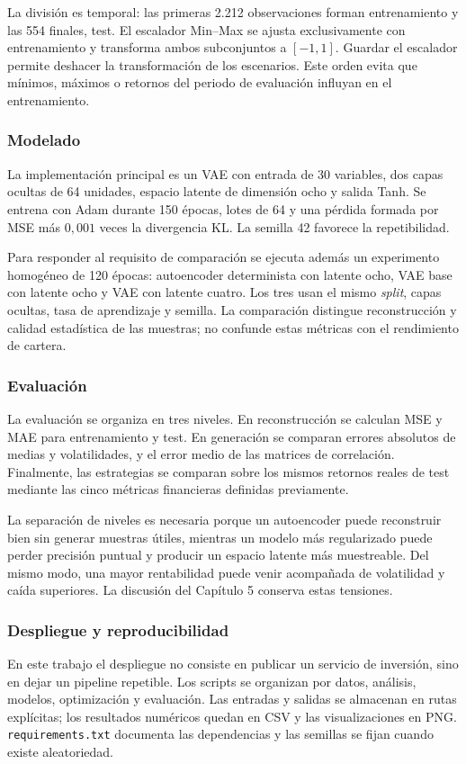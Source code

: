 La división es temporal: las primeras 2.212 observaciones forman entrenamiento y las 554 finales, test. El escalador Min--Max se ajusta exclusivamente con entrenamiento y transforma ambos subconjuntos a $[-1,1]$. Guardar el escalador permite deshacer la transformación de los escenarios. Este orden evita que mínimos, máximos o retornos del periodo de evaluación influyan en el entrenamiento.

\subsubsection{Modelado}
La implementación principal es un VAE con entrada de 30 variables, dos capas ocultas de 64 unidades, espacio latente de dimensión ocho y salida Tanh. Se entrena con Adam durante 150 épocas, lotes de 64 y una pérdida formada por MSE más $0{,}001$ veces la divergencia KL. La semilla 42 favorece la repetibilidad.

Para responder al requisito de comparación se ejecuta además un experimento homogéneo de 120 épocas: autoencoder determinista con latente ocho, VAE base con latente ocho y VAE con latente cuatro. Los tres usan el mismo \textit{split}, capas ocultas, tasa de aprendizaje y semilla. La comparación distingue reconstrucción y calidad estadística de las muestras; no confunde estas métricas con el rendimiento de cartera.

\subsubsection{Evaluación}
La evaluación se organiza en tres niveles. En reconstrucción se calculan MSE y MAE para entrenamiento y test. En generación se comparan errores absolutos de medias y volatilidades, y el error medio de las matrices de correlación. Finalmente, las estrategias se comparan sobre los mismos retornos reales de test mediante las cinco métricas financieras definidas previamente.

La separación de niveles es necesaria porque un autoencoder puede reconstruir bien sin generar muestras útiles, mientras un modelo más regularizado puede perder precisión puntual y producir un espacio latente más muestreable. Del mismo modo, una mayor rentabilidad puede venir acompañada de volatilidad y caída superiores. La discusión del Capítulo 5 conserva estas tensiones.

\subsubsection{Despliegue y reproducibilidad}
En este trabajo el despliegue no consiste en publicar un servicio de inversión, sino en dejar un pipeline repetible. Los scripts se organizan por datos, análisis, modelos, optimización y evaluación. Las entradas y salidas se almacenan en rutas explícitas; los resultados numéricos quedan en CSV y las visualizaciones en PNG. \texttt{requirements.txt} documenta las dependencias y las semillas se fijan cuando existe aleatoriedad.

